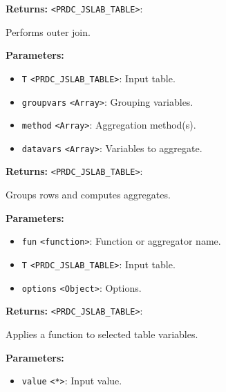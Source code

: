 \documentclass[12pt,a4paper]{article}
\begin{document}
\noindent \textbf{Returns:} \texttt{<PRDC\_JSLAB\_TABLE>}:

\noindent Performs outer join.

\vspace{5mm}
\noindent {}


\noindent \textbf{Parameters:}
\begin{itemize}
  \item \texttt{T} \texttt{<PRDC\_JSLAB\_TABLE>}: Input table.
  \item \texttt{groupvars} \texttt{<Array>}: Grouping variables.
  \item \texttt{method} \texttt{<Array>}: Aggregation method(s).
  \item \texttt{datavars} \texttt{<Array>}: Variables to aggregate.
\end{itemize}

\noindent \textbf{Returns:} \texttt{<PRDC\_JSLAB\_TABLE>}:

\noindent Groups rows and computes aggregates.

\vspace{5mm}
\noindent {}


\noindent \textbf{Parameters:}
\begin{itemize}
  \item \texttt{fun} \texttt{<function>}: Function or aggregator name.
  \item \texttt{T} \texttt{<PRDC\_JSLAB\_TABLE>}: Input table.
  \item \texttt{options} \texttt{<Object>}: Options.
\end{itemize}

\noindent \textbf{Returns:} \texttt{<PRDC\_JSLAB\_TABLE>}:

\noindent Applies a function to selected table variables.

\vspace{5mm}
\noindent {}


\noindent \textbf{Parameters:}
\begin{itemize}
  \item \texttt{value} \texttt{<*>}: Input value.
\end{itemize}
\end{document}
